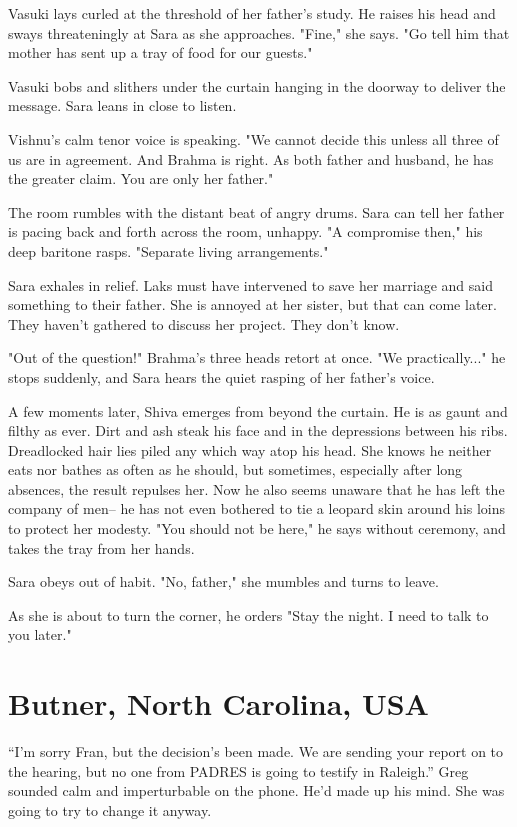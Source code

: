 \documentclass{article}
\begin{document}
Vasuki lays curled at the threshold of her father's study. He raises his head and sways threateningly at Sara as she approaches. "Fine," she says. "Go tell him that mother has sent up a tray of food for our guests."

Vasuki bobs and slithers under the curtain hanging in the doorway to deliver the message. Sara leans in close to listen. 

Vishnu's calm tenor voice is speaking. "We cannot decide this unless all three of us are in agreement. And Brahma is right. As both father and husband, he has the greater claim. You are only her father."

The room rumbles with the distant beat of angry drums. Sara can tell her father is pacing back and forth across the room, unhappy. "A compromise then," his deep baritone rasps. "Separate living arrangements." 

Sara exhales in relief. Laks must have intervened to save her marriage and said something to their father. She is annoyed at her sister, but that can come later. They haven't gathered to discuss her project. They don't know.

"Out of the question!" Brahma's three heads retort at once. "We practically..." he stops suddenly, and Sara hears the quiet rasping of her father's voice. 

A few moments later, Shiva emerges from beyond the curtain. He is as gaunt and filthy as ever. Dirt and ash steak his face and in the depressions between his ribs. Dreadlocked hair lies piled any which way atop his head. She knows he neither eats nor bathes as often as he should, but sometimes, especially after long absences, the result repulses her. Now he also seems unaware that he has left the company of men-- he has not even bothered to tie a leopard skin around his loins to protect her modesty. "You should not be here," he says without ceremony, and takes the tray from her hands. 

Sara obeys out of habit. "No, father," she mumbles and turns to leave.

As she is about to turn the corner, he orders "Stay the night. I need to talk to you later."

\section{Butner, North Carolina, USA}

“I’m sorry Fran, but the decision’s been made. We are sending your report on to the hearing, but no one from PADRES is going to testify in Raleigh.” Greg sounded calm and imperturbable on the phone. He’d made up his mind. She was going to try to change it anyway.
\end{document}
